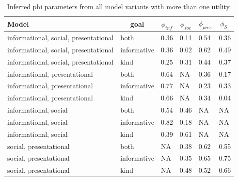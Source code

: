 \documentclass[12pt]{article}
\begin{document}
\begin{table}[tbp]
\begin{center}
\begin{threeparttable}
\caption{\label{tab:phi}Inferred phi parameters from all model variants with more than one utility.}
\begin{tabular}{llllll}
\toprule
Model & \multicolumn{1}{c}{goal} & \multicolumn{1}{c}{$\phi_{inf}$} & \multicolumn{1}{c}{$\phi_{soc}$} & \multicolumn{1}{c}{$\phi_{pres}$} & \multicolumn{1}{c}{$\phi_{S_1}$}\\
\midrule
informational, social, presentational & both & 0.36 & 0.11 & 0.54 & 0.36\\
informational, social, presentational & informative & 0.36 & 0.02 & 0.62 & 0.49\\
informational, social, presentational & kind & 0.25 & 0.31 & 0.44 & 0.37\\
informational, presentational & both & 0.64 & NA & 0.36 & 0.17\\
informational, presentational & informative & 0.77 & NA & 0.23 & 0.33\\
informational, presentational & kind & 0.66 & NA & 0.34 & 0.04\\
informational, social & both & 0.54 & 0.46 & NA & NA\\
informational, social & informative & 0.82 & 0.18 & NA & NA\\
informational, social & kind & 0.39 & 0.61 & NA & NA\\
social, presentational & both & NA & 0.38 & 0.62 & 0.55\\
social, presentational & informative & NA & 0.35 & 0.65 & 0.75\\
social, presentational & kind & NA & 0.48 & 0.52 & 0.66\\
\bottomrule
\end{tabular}
\end{threeparttable}
\end{center}
\end{table}
\end{document}
